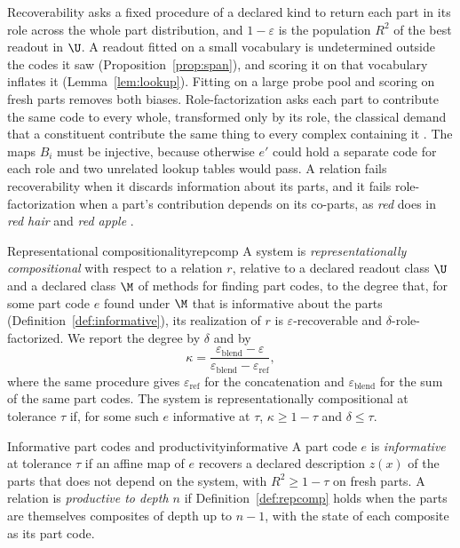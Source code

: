 Recoverability asks a fixed procedure of a declared kind to return each part in its role across the whole part distribution, and $1 - \varepsilon$ is the population $R^2$ of the best readout in $\U$. A readout fitted on a small vocabulary is undetermined outside the codes it saw (Proposition~\ref{prop:span}), and scoring it on that vocabulary inflates it (Lemma~\ref{lem:lookup}). Fitting on a large probe pool and scoring on fresh parts removes both biases. Role-factorization asks each part to contribute the same code to every whole, transformed only by its role, the classical demand that a constituent contribute the same thing to every complex containing it \citep{fodor1988}. The maps $B_i$ must be injective, because otherwise $e'$ could hold a separate code for each role and two unrelated lookup tables would pass. A relation fails recoverability when it discards information about its parts, and it fails role-factorization when a part's contribution depends on its co-parts, as \emph{red} does in \emph{red hair} and \emph{red apple} \citep{kamp1995}.

\begin{defbox}{Representational compositionality}{repcomp}
A system is \emph{representationally compositional} with respect to a relation $r$, relative to a declared readout class $\U$ and a declared class $\M$ of methods for finding part codes, to the degree that, for some part code $e$ found under $\M$ that is informative about the parts (Definition~\ref{def:informative}), its realization of $r$ is $\varepsilon$-recoverable and $\delta$-role-factorized. We report the degree by $\delta$ and by
\begin{equation}
  \kappa = \frac{\varepsilon_{\mathrm{blend}} - \varepsilon}{\varepsilon_{\mathrm{blend}} - \varepsilon_{\mathrm{ref}}},
  \label{eq:kappa}
\end{equation}
where the same procedure gives $\varepsilon_{\mathrm{ref}}$ for the concatenation and $\varepsilon_{\mathrm{blend}}$ for the sum of the same part codes. The system is representationally compositional at tolerance $\tau$ if, for some such $e$ informative at $\tau$, $\kappa \ge 1 - \tau$ and $\delta \le \tau$.
\end{defbox}

\begin{defbox}{Informative part codes and productivity}{informative}
A part code $e$ is \emph{informative} at tolerance $\tau$ if an affine map of $e$ recovers a declared description $z(x)$ of the parts that does not depend on the system, with $R^2 \ge 1 - \tau$ on fresh parts. A relation is \emph{productive to depth $n$} if Definition~\ref{def:repcomp} holds when the parts are themselves composites of depth up to $n - 1$, with the state of each composite as its part code.
\end{defbox}

